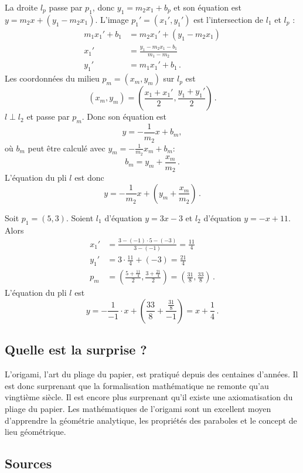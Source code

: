 La droite $l_p$ passe par $p_1$, donc $y_1=m_2x_1+b_p$ et son équation est $y=m_2x+(y_1-m_2x_1)$. L'image $p_1'=(x_1',y_1')$ est l'intersection de $l_1$ et $l_p$ :
\begin{align*}
m_1x_1'+b_1&=m_2x_1'+(y_1-m_2x_1)\\
x_1'&=\frac{y_1-m_2x_1-b_1}{m_1-m_2}\\
y_1'&=m_1x_1'+b_1\,.
\end{align*}
Les coordonnées du milieu $p_m=(x_m,y_m)$ sur $l_p$ est 
\[
(x_m,y_m)=\left(\frac{x_1+x_1'}{2},\frac{y_1+y_1'}{2}\right)\,.
\]
$l\perp l_2$ et  passe par $p_m$. Donc son équation est 
\[
y=-\frac{1}{m_2}x+b_m,
\]
où $b_m$ peut être calculé avec   $y_m=-\displaystyle\frac{1}{m_2}x_m+b_m$:
\[b_m=y_m+\frac{x_m}{m_2}\,.\]
L'équation du pli $l$ est donc 
\[
y=-\frac{1}{m_2}x+\left(y_m+\displaystyle\frac{x_m}{m_2}\right)\,.
\]
\begin{example}
Soit $p_1=(5,3)$. Soient  $l_1$ d'équation $y=3x-3$ et  $l_2$ d'équation $y=-x+11$. Alors 
\begin{align*}
x_1'&=\frac{3-(-1)\cdot 5-(-3)}{3-(-1)}=\frac{11}{4}\\
y_1'&=3\cdot \frac{11}{4} + (-3)=\frac{21}{4}\\
p_m&=\left(\frac{5+\displaystyle\frac{11}{4}}{2},\frac{3+\displaystyle\frac{21}{4}}{2}\right)=\left(\frac{31}{8},\frac{33}{8}\right)\,.
\end{align*}
L'équation du pli $l$ est 
\[
y=-\frac{1}{-1}\cdot x+\left(\frac{33}{8}+\frac{\displaystyle\frac{31}{8}}{-1}\right)=x+\frac{1}{4}\,.
\]
\end{example}

\vspace{-2ex}

\subsection*{Quelle est la surprise ?}

L'origami, l'art du pliage du papier, est pratiqué depuis des centaines d'années. Il est donc surprenant que la formalisation mathématique ne remonte qu'au vingtième siècle. Il est encore plus surprenant qu'il existe une axiomatisation du pliage du papier. Les mathématiques de l'origami sont un excellent moyen d'apprendre la géométrie analytique, les propriétés des paraboles et le concept de lieu géométrique.

\vspace{-2ex}

\subsection*{Sources}

